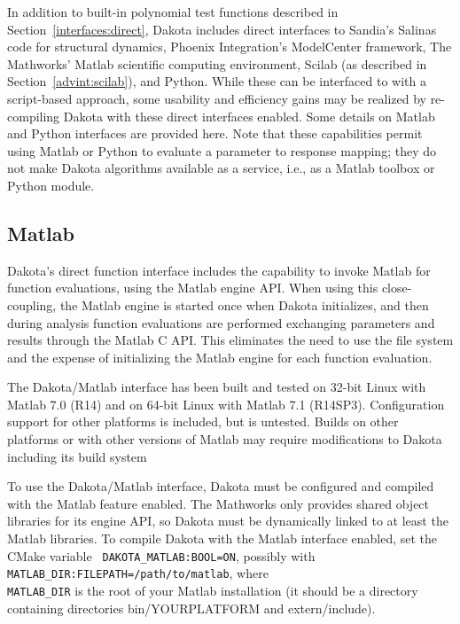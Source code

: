 In addition to built-in polynomial test functions described in
Section~\ref{interfaces:direct}, Dakota includes direct interfaces to
Sandia's Salinas code for structural dynamics, Phoenix Integration's
ModelCenter framework, The Mathworks' Matlab scientific computing
environment, Scilab (as described in Section~\ref{advint:scilab}), and
Python. While these can be interfaced to with a script-based
approach, some usability and efficiency gains may be realized by
re-compiling Dakota with these direct interfaces enabled. Some
details on Matlab and Python interfaces are provided here. Note that
these capabilities permit using Matlab or Python to evaluate a
parameter to response mapping; they do not make Dakota algorithms
available as a service, i.e., as a Matlab toolbox or Python module.

\subsection{Matlab}\label{advint:existingdirect:matlab} 

Dakota's direct function interface includes the capability to invoke
Matlab for function evaluations, using the Matlab engine API. When
using this close-coupling, the Matlab engine is started once when
Dakota initializes, and then during analysis function evaluations are
performed exchanging parameters and results through the Matlab C API.
This eliminates the need to use the file system and the expense of
initializing the Matlab engine for each function evaluation.

The Dakota/Matlab interface has been built and tested on 32-bit Linux
with Matlab 7.0 (R14) and on 64-bit Linux with Matlab 7.1 (R14SP3).
Configuration support for other platforms is included, but is
untested. Builds on other platforms or with other versions of Matlab
may require modifications to Dakota including its build system

To use the Dakota/Matlab interface, Dakota must be configured and
compiled with the Matlab feature enabled. The Mathworks only provides
shared object libraries for its engine API, so Dakota must be
dynamically linked to at least the Matlab libraries. To compile
Dakota with the Matlab interface enabled, set the CMake variable {\tt
  DAKOTA\_MATLAB:BOOL=ON}, possibly with {\tt
  MATLAB\_DIR:FILEPATH=/path/to/matlab}, where \\ {\tt MATLAB\_DIR} is the
root of your Matlab installation (it should be a directory containing
directories bin/YOURPLATFORM and extern/include).

